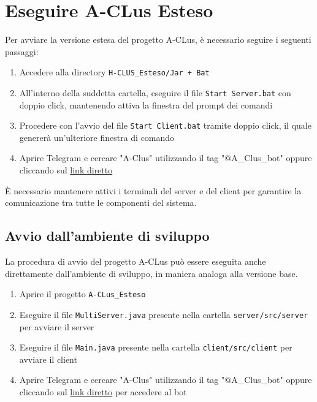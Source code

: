 
\section{Eseguire A-CLus Esteso}


Per avviare la versione estesa del progetto A-CLus, è necessario seguire i seguenti passaggi:
\begin{enumerate}
    \item Accedere alla directory \texttt{H-CLUS\_Esteso/Jar + Bat}
    \item All'interno della suddetta cartella, eseguire il file \texttt{Start Server.bat} con doppio click, mantenendo attiva la finestra del prompt dei comandi
    \item Procedere con l'avvio del file \texttt{Start Client.bat} tramite doppio click, il quale genererà un'ulteriore finestra di comando
    \item Aprire Telegram e cercare "A-Clus" utilizzando il tag "@A\_Clus\_bot" oppure cliccando sul \href{https://shorturl.at/r07hj}{link diretto}
\end{enumerate}

\begin{tcolorbox}[colback=white, colframe=gray, title=Avvertenza]
    È necessario mantenere attivi i terminali del server e del client per garantire la comunicazione tra tutte le componenti del sistema.
\end{tcolorbox}

\subsection{Avvio dall'ambiente di sviluppo}

La procedura di avvio del progetto A-CLus può essere eseguita anche direttamente dall'ambiente di sviluppo, in maniera analoga alla versione base. 

\begin{enumerate}
    \item Aprire il progetto \texttt{A-CLus\_Esteso}
    \item Eseguire il file \texttt{MultiServer.java} presente nella cartella \texttt{server/src/server} per avviare il server
    \item Eseguire il file \texttt{Main.java} presente nella cartella \texttt{client/src/client} per avviare il client
    \item Aprire Telegram e cercare "A-Clus" utilizzando il tag "@A\_Clus\_bot" oppure cliccando sul \href{https://shorturl.at/r07hj}{link diretto} per accedere al bot 
\end{enumerate}

